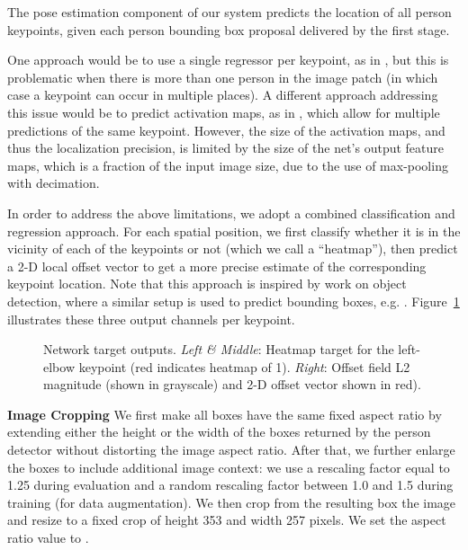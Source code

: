 \documentclass[10pt,twocolumn,letterpaper]{article}
\begin{document}
The pose estimation component of our system predicts the location of all  person keypoints, given each person bounding box proposal delivered by the first stage.

One approach would be to use a single regressor per keypoint, as in \cite{deeppose}, but this is problematic when there is more than one person in the image patch (in which case a keypoint can occur in multiple places). A different approach addressing this issue would be to predict activation maps, as in \cite{jainiclr2014}, which allow for multiple predictions of the same keypoint. However, the size of the activation maps, and thus the localization precision, is limited by the size of the net's output feature maps, which is a fraction of the input image size, due to the use of max-pooling with decimation.

In order to address the above limitations, we adopt a combined classification and regression approach. For each spatial position, we first classify whether it is in the vicinity of each of the  keypoints or not (which we call a ``heatmap''), then predict a 2-D local offset vector to get a more precise estimate of the corresponding keypoint location. Note that this approach is inspired by work on object detection, where a similar setup is used to predict bounding boxes, e.g. \cite{erhan2014scalable, Ren2015}. Figure~\ref{fig:gt_heatmap_offset} illustrates these three output channels per keypoint.

\begin{figure}[h]
\centering
{}
\hfill
\caption{Network target outputs. \emph{Left \& Middle}: Heatmap target for the left-elbow keypoint (red indicates heatmap of 1). \emph{Right}: Offset field L2 magnitude (shown in grayscale) and 2-D offset vector shown in red).}
\label{fig:gt_heatmap_offset}
\end{figure}

\newcommand{\fcls}{f_{\mathrm{cls}}}
\newcommand{\floc}{f_{\mathrm{loc}}}

\textbf{Image Cropping}
We first make all boxes have the same fixed aspect ratio by extending either the height or the width of the boxes returned by the person detector without distorting the image aspect ratio. After that, we further enlarge the boxes to include additional image context: we use a rescaling factor equal to 1.25 during evaluation and a random rescaling factor between 1.0 and 1.5 during training (for data augmentation). We then crop from the resulting box the image and resize to a fixed crop of height 353 and width 257 pixels. We set the aspect ratio value to .
\end{document}
